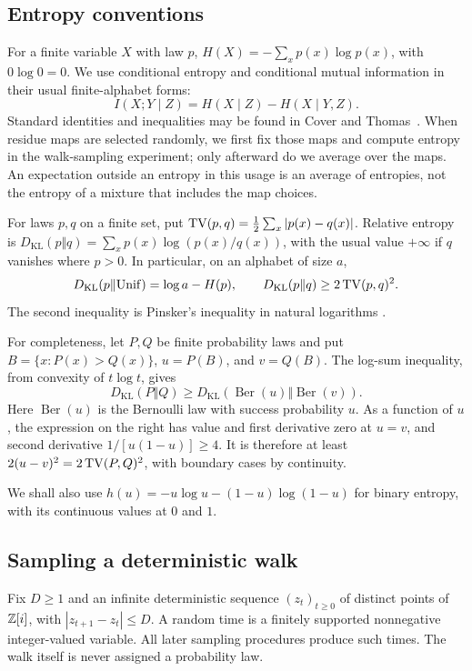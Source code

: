 \subsection{Entropy conventions}

For a finite variable \(X\) with law \(p\),
\(H(X)=-\sum_xp(x)\log p(x)\), with \(0\log0=0\).
We use conditional entropy and conditional mutual information in
their usual finite-alphabet forms:
\[
I(X;Y\mid Z)=H(X\mid Z)-H(X\mid Y,Z).
\]
Standard identities and inequalities may be found in
Cover and Thomas~\cite[Chapter 2]{CoverThomas}.
When residue maps are selected randomly, we first fix those maps
and compute entropy in the walk-sampling experiment; only afterward
do we average over the maps.
An expectation outside an entropy in this usage is an average of
entropies, not the entropy of a mixture that includes the map choices.

For laws \(p,q\) on a finite set, put
\(\operatorname{TV}(p,q)=\frac12\sum_x|p(x)-q(x)|\).
Relative entropy is
\(D_{\mathrm{KL}}(p\Vert q)=\sum_xp(x)\log(p(x)/q(x))\),
with the usual value \(+\infty\) if \(q\) vanishes where \(p>0\).
In particular, on an alphabet of size \(a\),
\[
D_{\mathrm{KL}}(p\Vert\mathrm{Unif})=\log a-H(p),
\qquad D_{\mathrm{KL}}(p\Vert q)\ge2\operatorname{TV}(p,q)^2.
\]
The second inequality is Pinsker's inequality in natural logarithms
\cite[Lemma 11.6.1]{CoverThomas}.

For completeness, let $P,Q$ be finite probability laws and put
\(B=\{x:P(x)>Q(x)\}\), \(u=P(B)\), and \(v=Q(B)\).
The log-sum inequality, from convexity of \(t\log t\), gives
\[
 D_{\mathrm{KL}}(P\Vert Q)
 \ge D_{\mathrm{KL}}(\operatorname{Ber}(u)\Vert
                          \operatorname{Ber}(v)).
\]
Here $\operatorname{Ber}(u)$ is the Bernoulli law with success probability $u$.
As a function of \(u\), the expression on the right has value and
first derivative zero at \(u=v\), and second derivative
\(1/[u(1-u)]\ge4\). It is therefore at least
\(2(u-v)^2=2\operatorname{TV}(P,Q)^2\), with boundary cases by continuity.

We shall also use \(h(u)=-u\log u-(1-u)\log(1-u)\) for binary entropy,
with its continuous values at \(0\) and \(1\).

\subsection{Sampling a deterministic walk}

Fix \(D\ge1\) and an infinite deterministic sequence
\((z_t)_{t\ge0}\) of distinct points of \(\mathbb Z[i]\), with
\(|z_{t+1}-z_t|\le D\).
A random time is a finitely supported nonnegative integer-valued
variable. All later sampling procedures produce such times.
The walk itself is never assigned a probability law.

